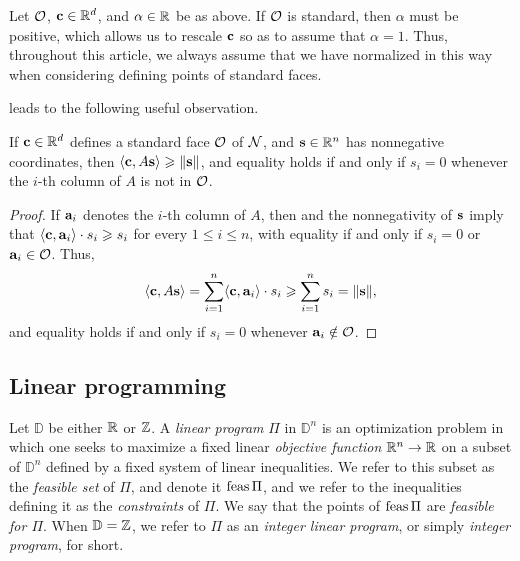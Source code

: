 \documentclass[11pt]{amsart}
\begin{document}
\begin{convention}
\label{alpha=1: convention}
Let $\mathcal{O}$, $\mathbf{c} \in \mathbb{R}^d$, and $\alpha \in \mathbb{R}$ be as above.  If $\mathcal{O}$ is standard, then $\alpha$ must be positive, which allows us to rescale $\mathbf{c}$ so as to assume that $\alpha = 1$.   Thus, throughout this article, we always assume that we have normalized in this way when considering defining points of standard faces.
\end{convention}

 leads to the following useful observation.

\begin{proposition}\label{prop: inner product with columns of A}
   If $\mathbf{c} \in \mathbb{R}^d$ defines a standard face $\mathcal{O}$ of $\mathcal{N}$, and $\mathbf{s} \in \mathbb{R}^n$ has nonnegative coordinates, then $\langle \mathbf{c}, A\mathbf{s} \rangle \geqslant \| \mathbf{s} \|$,  and equality holds if and only if $s_i = 0$ whenever the $i$-th column of $A$ is not in $\mathcal{O}$. 
\end{proposition}

\begin{proof}
If $\mathbf{a}_i$ denotes the $i$-th column of $A$, then  and the nonnegativity of $\mathbf{s}$ imply that $\langle \mathbf{c}, \mathbf{a}_i \rangle \cdot s_i \geqslant s_i$ for every $1 \leq i \leq n$, with equality if and only if $s_i = 0$ or $\mathbf{a}_i \in \mathcal{O}$.
Thus,
\[ \langle \mathbf{c}, A\mathbf{s} \rangle = \sum_{i=1}^n \langle \mathbf{c}, \mathbf{a}_i \rangle \cdot s_i \geqslant  \sum_{i=1}^n s_i  = \| \mathbf{s} \|,\]
and equality holds if and only if $s_i = 0$ whenever $\mathbf{a}_i \notin \mathcal{O}$.
\end{proof}

\subsection{Linear programming}  

Let $\mathbb{D}$ be either $\mathbb{R}$ or $\mathbb{Z}$.
A \emph{linear program} $\Pi$ in $\mathbb{D}^n$ is an optimization problem in which one seeks to maximize a fixed linear \emph{objective function} $\mathbb{R}^n \to \mathbb{R}$ on a subset of $\mathbb{D}^n$ defined by a fixed system of linear inequalities.
We refer to this subset as the \emph{feasible set} of $\Pi$, and denote it $\operatorname{feas} \Pi$, and we refer to the inequalities defining it as the \emph{constraints} of $\Pi$.
We say that the points of $\operatorname{feas} \Pi$ are \emph{feasible for $\Pi$}.
When $\mathbb{D} = \mathbb{Z}$, we refer to $\Pi$ as an \emph{integer linear program}, or simply \emph{integer program}, for short.  
\end{document}
